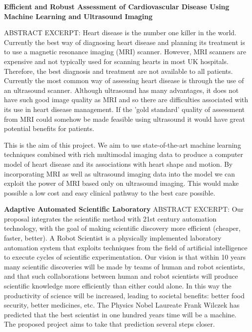 \documentclass[11pt]{article}
\begin{document}
\begin{tcolorbox}[fontupper=\small, parbox=false]

\textbf{Efficient and Robust Assessment of Cardiovascular Disease Using Machine Learning and Ultrasound Imaging}

ABSTRACT EXCERPT: Heart disease is the number one killer in the world. Currently the best way of diagnosing heart disease and planning its treatment is to use a magnetic resonance imaging (MRI) scanner. However, MRI scanners are expensive and not typically used for scanning hearts in most UK hospitals. Therefore, the best diagnosis and treatment are not available to all patients. Currently the most common way of assessing heart disease is through the use of an ultrasound scanner. Although ultrasound has many advantages, it does not have such good image quality as MRI and so there are difficulties associated with its use in heart disease management. If the 'gold standard' quality of assessment from MRI could somehow be made feasible using ultrasound it would have great potential benefits for patients.

This is the aim of this project. We aim to use state-of-the-art machine learning techniques combined with rich multimodal imaging data to produce a computer model of heart disease and its associations with heart shape and motion. By incorporating MRI as well as ultrasound imaging data into the model we can exploit the power of MRI based only on ultrasound imaging. This would make possible a low cost and easy clinical pathway to the best care possible.

\textbf{Adaptive Automated Scientific Laboratory}
ABSTRACT EXCERPT: Our proposal integrates the scientific method with 21st century automation technology, with the goal of making scientific discovery more efficient (cheaper, faster, better). A Robot Scientist is a physically implemented laboratory automation system that exploits techniques from the field of artificial intelligence to execute cycles of scientific experimentation. Our vision is that within 10 years many scientific discoveries will be made by teams of human and robot scientists, and that such collaborations between human and robot scientists will produce scientific knowledge more efficiently than either could alone. In this way the productivity of science will be increased, leading to societal benefits: better food security, better medicines, etc. The Physics Nobel Laureate Frank Wilczek has predicted that the best scientist in one hundred years time will be a machine. The proposed project aims to take that prediction several steps closer.


\end{tcolorbox}
\end{document}
